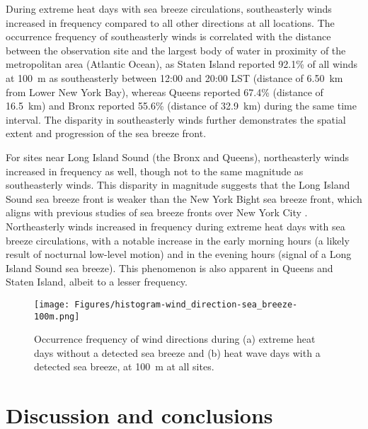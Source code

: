 During extreme heat days with sea breeze circulations, southeasterly winds increased in frequency compared to all other directions at all locations. The occurrence frequency of southeasterly winds is correlated with the distance between the observation site and the largest body of water in proximity of the metropolitan area (Atlantic Ocean), as Staten Island reported 92.1\% of all winds at \SI{100}{\meter} as southeasterly between 12:00 and 20:00 LST (distance of \SI{6.50}{\kilo\meter} from Lower New York Bay), whereas Queens reported 67.4\% (distance of \SI{16.5}{\kilo\meter}) and Bronx reported 55.6\% (distance of \SI{32.9}{\kilo\meter}) during the same time interval. The disparity in southeasterly winds further demonstrates the spatial extent and progression of the sea breeze front.

For sites near Long Island Sound (the Bronx and Queens), northeasterly winds increased in frequency as well, though not to the same magnitude as southeasterly winds. This disparity in magnitude suggests that the Long Island Sound sea breeze front is weaker than the New York Bight sea breeze front, which aligns with previous studies of sea breeze fronts over New York City \citep{frizzola1963, meir2013}. Northeasterly winds increased in frequency during extreme heat days with sea breeze circulations, with a notable increase in the early morning hours (a likely result of nocturnal low-level motion) and in the evening hours (signal of a Long Island Sound sea breeze). This phenomenon is also apparent in Queens and Staten Island, albeit to a lesser frequency. 

\begin{figure}[ht]
	\centering
	\texttt{[image: Figures/histogram-wind\_direction-sea\_breeze-100m.png]}
	\caption{Occurrence frequency of wind directions during (a) extreme heat days without a detected sea breeze and (b) heat wave days with a detected sea breeze, at \SI{100}{\meter} at all sites.}
	\label{fig:wind_direction-heat_wave-sea_breeze-histogram}
\end{figure}

\FloatBarrier

\section{Discussion and conclusions} \label{section:discussion_conclusion}

